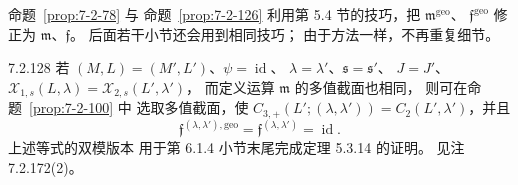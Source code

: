 命题~\ref{prop:7-2-78} 与
命题~\ref{prop:7-2-126}
利用第 5.4 节的技巧，把
$\mathfrak m^{\mathrm{geo}}$、
$\mathfrak f^{\mathrm{geo}}$
修正为 $\mathfrak m$、$\mathfrak f$。
后面若干小节还会用到相同技巧；
由于方法一样，不再重复细节。

\begin{remark}{7.2.128}\label{rem:7-2-128}
若 $(M,L)=(M',L')$、$\psi=\operatorname{id}$、
$\lambda=\lambda'$、$\mathfrak s=\mathfrak s'$、
$J=J'$、
$\mathcal X_{1,s}(L,\lambda)
=\mathcal X_{2,s}(L',\lambda')$，
而定义运算 $\mathfrak m$ 的多值截面也相同，
则可在命题~\ref{prop:7-2-100} 中
选取多值截面，使
$C_{3,+}(L';(\lambda,\lambda'))
=C_2(L',\lambda')$，并且
\[
\mathfrak f^{(\lambda,\lambda'),\mathrm{geo}}
=\mathfrak f^{(\lambda,\lambda')}
=\operatorname{id}.
\]
上述等式的双模版本
用于第 6.1.4 小节末尾完成定理 5.3.14 的证明。
见注 7.2.172(2)。
\end{remark}

